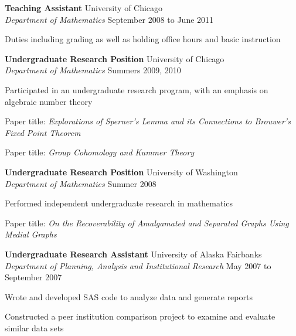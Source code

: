 \documentclass{article}
\begin{document}
\begin{flushleft}
\hspace{20pt}
{\bf Teaching Assistant} \hfill University of Chicago\\
\hspace{20pt}
{\it Department of Mathematics} \hfill September 2008 to June 2011\\
\vspace{-6pt}
\begin{list}{}{\leftmargin=50pt}\setlength{\itemsep}{-2pt}
\item Duties including grading as well as holding office hours and basic instruction
\end{list}

\hspace{20pt}
{\bf Undergraduate Research Position} \hfill University of Chicago\\
\hspace{20pt}
{\it Department of Mathematics} \hfill Summers 2009, 2010\\
\vspace{-6pt}
\begin{list}{}{\leftmargin=50pt}\setlength{\itemsep}{-2pt}
\item Participated in an undergraduate research program, with an emphasis on algebraic number theory
\item Paper title: {\it Explorations of Sperner's Lemma and its Connections to Brouwer's Fixed Point Theorem}
\item Paper title: {\it Group Cohomology and Kummer Theory}
\end{list}

\hspace{20pt}
{\bf Undergraduate Research Position} \hfill University of Washington\\
\hspace{20pt}
{\it Department of Mathematics} \hfill Summer 2008\\
\vspace{-6pt}
\begin{list}{}{\leftmargin=50pt}\setlength{\itemsep}{-2pt}
\item Performed independent undergraduate research in mathematics
\item Paper title: {\it On the Recoverability of Amalgamated and Separated Graphs Using Medial Graphs}
\end{list}

\hspace{20pt}
{\bf Undergraduate Research Assistant} \hfill University of Alaska Fairbanks\\
\hspace{20pt}
{\it Department of Planning, Analysis and Institutional Research} \hfill May 2007 to September 2007\\
\vspace{-6pt}
\begin{list}{}{\leftmargin=50pt}\setlength{\itemsep}{-2pt}
\item Wrote and developed SAS code to analyze data and generate reports
\item Constructed a peer institution comparison project to examine and evaluate similar data sets
\end{list}


\end{flushleft}
\end{document}
